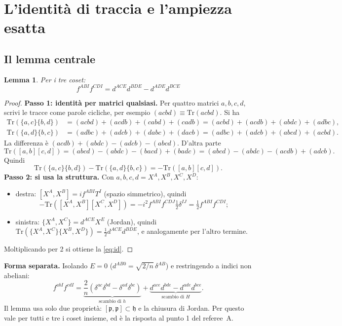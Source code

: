 \documentclass[11pt,a4paper]{article}
\numberwithin{equation}{section}
\newtheorem{lem}{Lemma}
\theoremstyle{remark}
\newcommand{\Tr}{\mathrm{Tr}}
\newcommand{\p}{\mathfrak{p}}
\newcommand{\h}{\mathfrak{h}}
\begin{document}
\section{L'identità di traccia e l'ampiezza esatta}
\label{sec:amp}

\subsection{Il lemma centrale}

\begin{lem}
\label{lem:trace}
Per i tre coset:
\begin{equation}
\boxed{\;f^{ABI}f^{CDI}=d^{ACE}d^{BDE}-d^{ADE}d^{BCE}\;}
\label{eq:id}
\end{equation}
\end{lem}
\begin{proof}
\textbf{Passo 1: identità per matrici qualsiasi.} Per quattro matrici $a,b,c,d$, scrivi le tracce come parole cicliche, per esempio $(acbd)\equiv\Tr(acbd)$. Si ha
\begin{align*}
\Tr(\{a,c\}\{b,d\})&=(acbd)+(acdb)+(cabd)+(cadb)=(acbd)+(acdb)+(abdc)+(adbc),\\
\Tr(\{a,d\}\{b,c\})&=(adbc)+(adcb)+(dabc)+(dacb)=(adbc)+(adcb)+(abcd)+(acbd).
\end{align*}
La differenza è $(acdb)+(abdc)-(adcb)-(abcd)$. D'altra parte
\[
\Tr([a,b][c,d])=(abcd)-(abdc)-(bacd)+(badc)=(abcd)-(abdc)-(acdb)+(adcb).
\]
Quindi
\begin{equation}
\Tr(\{a,c\}\{b,d\})-\Tr(\{a,d\}\{b,c\})=-\Tr([a,b][c,d]).
\label{eq:traceid}
\end{equation}
\textbf{Passo 2: si usa la struttura.} Con $a,b,c,d=X^A,X^B,X^C,X^D$:
\begin{itemize}
\item destra: $[X^A,X^B]=if^{ABI}T^I$ (spazio simmetrico), quindi
\[
-\Tr([X^A,X^B][X^C,X^D])=-i^2f^{ABI}f^{CDJ}\tfrac12\delta^{IJ}=\tfrac12f^{ABI}f^{CDI};
\]
\item sinistra: $\{X^A,X^C\}=d^{ACE}X^E$ (Jordan), quindi $\Tr(\{X^A,X^C\}\{X^B,X^D\})=\frac12d^{ACE}d^{BDE}$, e analogamente per l'altro termine.
\end{itemize}
Moltiplicando per 2 si ottiene la \eqref{eq:id}.
\end{proof}

\textbf{Forma separata.} Isolando $E=0$ ($d^{AB0}=\sqrt{2/n}\,\delta^{AB}$) e restringendo a indici non abeliani:
\begin{equation}
f^{abI}f^{cdI}=\underbrace{\frac2n(\delta^{ac}\delta^{bd}-\delta^{ad}\delta^{bc})}_{\text{scambio di }h}+\underbrace{d^{ace}d^{bde}-d^{ade}d^{bce}}_{\text{scambio di }H}.
\label{eq:id2}
\end{equation}
Il lemma usa solo due proprietà: $[\p,\p]\subset\h$ e la chiusura di Jordan. Per questo vale per tutti e tre i coset insieme, ed è la risposta al punto 1 del referee~A.
\end{document}
